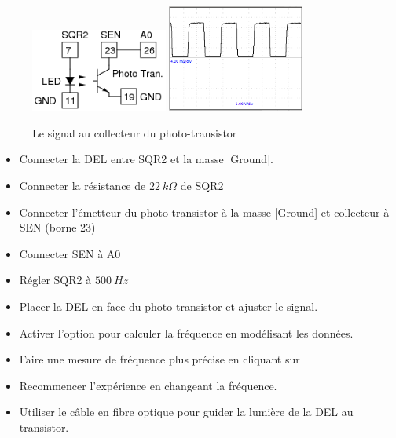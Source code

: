 \documentclass{book}
\begin{document}
\begin{figure}[h!]
\begin{center}
\caption{\label{fig:Phototransistor-output}Le signal au collecteur du photo-transistor }\vspace{0.5em}
\includegraphics[width=0.4\textwidth, height=0.3\textwidth, keepaspectratio]{Schematic-opto-tran.png}
\includegraphics[width=0.4\textwidth, height=0.3\textwidth, keepaspectratio]{Pic-phototran-sqr-received.png}
\end{center}
\end{figure}



\begin{itemize}
  \item Connecter la DEL entre SQR2 et la masse [Ground].
  \item Connecter la résistance de $22\ k\Omega$   de SQR2
  \item Connecter l'émetteur du photo-transistor à la masse [Ground] et collecteur à SEN (borne 23)
  \item Connecter SEN à A0
  \item Régler SQR2 à $500\ Hz$
  \item Placer la DEL en face du photo-transistor et ajuster le signal.
  \item Activer l'option   pour calculer la fréquence en modélisant les données.
  \item Faire une mesure de fréquence plus précise en cliquant sur  
  \item Recommencer l'expérience en changeant la fréquence.
  \item Utiliser le câble en fibre optique pour guider la lumière de la DEL au transistor.
\end{itemize}
\end{document}
